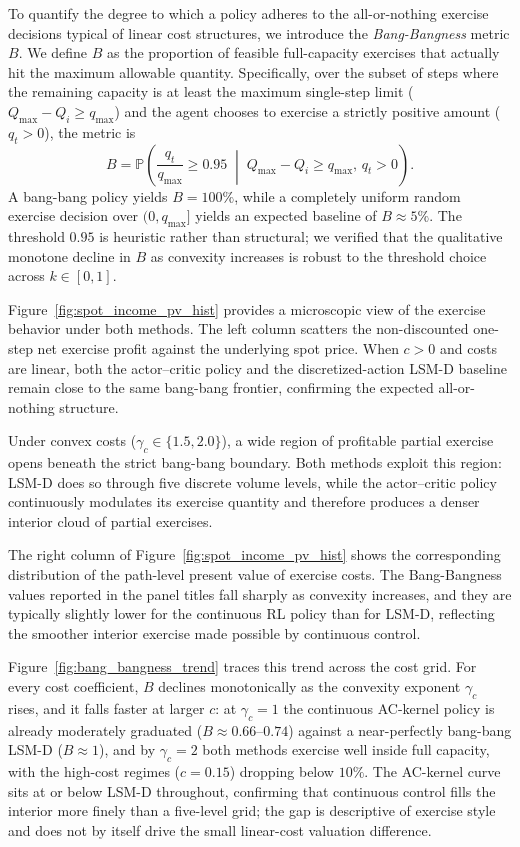 \documentclass[a4paper,fleqn]{cas-dc}
\begin{document}
To quantify the degree to which a policy adheres to the all-or-nothing exercise decisions typical of linear cost structures, we introduce the \emph{Bang-Bangness} metric $B$. We define $B$ as the proportion of feasible full-capacity exercises that actually hit the maximum allowable quantity. Specifically, over the subset of steps where the remaining capacity is at least the maximum single-step limit ($Q_{\max} - Q_i \ge q_{\max}$) and the agent chooses to exercise a strictly positive amount ($q_t > 0$), the metric is
\begin{equation}
    B = \mathbb{P}\left( \frac{q_t}{q_{\max}} \ge 0.95 \;\middle|\; Q_{\max} - Q_i \ge q_{\max},\, q_t > 0 \right).
\end{equation}
A bang-bang policy yields $B=100\%$, while a completely uniform random exercise decision over $(0,q_{\max}]$ yields an expected baseline of $B \approx 5\%$. The threshold $0.95$ is heuristic rather than structural; we verified that the qualitative monotone decline in $B$ as convexity increases is robust to the threshold choice across $k \in [0,1]$.

Figure~\ref{fig:spot_income_pv_hist} provides a microscopic view of the exercise behavior under both methods. The left column scatters the non-discounted one-step net exercise profit against the underlying spot price. When $c>0$ and costs are linear, both the actor--critic policy and the discretized-action LSM-D baseline remain close to the same bang-bang frontier, confirming the expected all-or-nothing structure.

Under convex costs ($\gamma_c \in \{1.5,2.0\}$), a wide region of profitable partial exercise opens beneath the strict bang-bang boundary. Both methods exploit this region: LSM-D does so through five discrete volume levels, while the actor--critic policy continuously modulates its exercise quantity and therefore produces a denser interior cloud of partial exercises.

The right column of Figure~\ref{fig:spot_income_pv_hist} shows the corresponding distribution of the path-level present value of exercise costs. The Bang-Bangness values reported in the panel titles fall sharply as convexity increases, and they are typically slightly lower for the continuous RL policy than for LSM-D, reflecting the smoother interior exercise made possible by continuous control.

Figure~\ref{fig:bang_bangness_trend} traces this trend across the cost grid. For every cost coefficient, $B$ declines monotonically as the convexity exponent $\gamma_c$ rises, and it falls faster at larger $c$: at $\gamma_c=1$ the continuous AC-kernel policy is already moderately graduated ($B\approx0.66$--$0.74$) against a near-perfectly bang-bang LSM-D ($B\approx1$), and by $\gamma_c=2$ both methods exercise well inside full capacity, with the high-cost regimes ($c=0.15$) dropping below $10\%$. The AC-kernel curve sits at or below LSM-D throughout, confirming that continuous control fills the interior more finely than a five-level grid; the gap is descriptive of exercise style and does not by itself drive the small linear-cost valuation difference.
\end{document}
